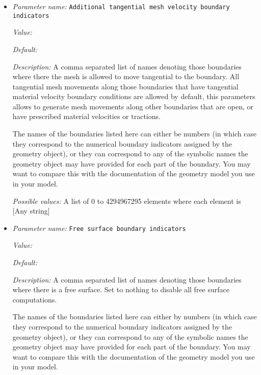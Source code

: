 \begin{itemize}
\item {\it Parameter name:} {\tt Additional tangential mesh velocity boundary indicators}
\label{parameters:Free surface/Additional tangential mesh velocity boundary indicators}


{\it Value:} 


{\it Default:} 


{\it Description:} A comma separated list of names denoting those boundaries where there the mesh is allowed to move tangential to the boundary. All tangential mesh movements along those boundaries that have tangential material velocity boundary conditions are allowed by default, this parameters allows to generate mesh movements along other boundaries that are open, or have prescribed material velocities or tractions.

The names of the boundaries listed here can either be numbers (in which case they correspond to the numerical boundary indicators assigned by the geometry object), or they can correspond to any of the symbolic names the geometry object may have provided for each part of the boundary. You may want to compare this with the documentation of the geometry model you use in your model.


{\it Possible values:} A list of 0 to 4294967295 elements where each element is [Any string]
\item {\it Parameter name:} {\tt Free surface boundary indicators}
\label{parameters:Free surface/Free surface boundary indicators}


{\it Value:} 


{\it Default:} 


{\it Description:} A comma separated list of names denoting those boundaries where there is a free surface. Set to nothing to disable all free surface computations.

The names of the boundaries listed here can either by numbers (in which case they correspond to the numerical boundary indicators assigned by the geometry object), or they can correspond to any of the symbolic names the geometry object may have provided for each part of the boundary. You may want to compare this with the documentation of the geometry model you use in your model.



\end{itemize}
